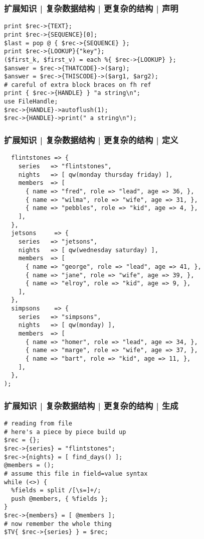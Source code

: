\begin{frame}[fragile]
  \frametitle{扩展知识 | 复杂数据结构 | 更复杂的结构 | 声明}
\begin{lstlisting}
print $rec->{TEXT};
print $rec->{SEQUENCE}[0];
$last = pop @ { $rec->{SEQUENCE} };
print $rec->{LOOKUP}{"key"};
($first_k, $first_v) = each %{ $rec->{LOOKUP} };
$answer = $rec->{THATCODE}->($arg);
$answer = $rec->{THISCODE}->($arg1, $arg2);
# careful of extra block braces on fh ref
print { $rec->{HANDLE} } "a string\n";
use FileHandle;
$rec->{HANDLE}->autoflush(1);
$rec->{HANDLE}->print(" a string\n");
\end{lstlisting}
\end{frame}

\begin{frame}[fragile]
  \frametitle{扩展知识 | 复杂数据结构 | 更复杂的结构 | 定义}
\begin{lstlisting}[basicstyle=\footnotesize\tt]
%TV = (
  flintstones => {
    series   => "flintstones",
    nights   => [ qw(monday thursday friday) ],
    members  => [
      { name => "fred", role => "lead", age => 36, },
      { name => "wilma", role => "wife", age => 31, },
      { name => "pebbles", role => "kid", age => 4, },
    ],
  },
  jetsons     => {
    series   => "jetsons",
    nights   => [ qw(wednesday saturday) ],
    members  => [
      { name => "george", role => "lead", age => 41, },
      { name => "jane", role => "wife", age => 39, },
      { name => "elroy", role => "kid", age => 9, },
    ],
  },
  simpsons    => {
    series   => "simpsons",
    nights   => [ qw(monday) ],
    members  => [
      { name => "homer", role => "lead", age => 34, },
      { name => "marge", role => "wife", age => 37, },
      { name => "bart", role => "kid", age => 11, },
    ],
  },
);
\end{lstlisting}
\end{frame}

\begin{frame}[fragile]
  \frametitle{扩展知识 | 复杂数据结构 | 更复杂的结构 | 生成}
\begin{lstlisting}
# reading from file
# here's a piece by piece build up
$rec = {};
$rec->{series} = "flintstones";
$rec->{nights} = [ find_days() ];
@members = ();
# assume this file in field=value syntax
while (<>) {
  %fields = split /[\s=]+/;
  push @members, { %fields };
}
$rec->{members} = [ @members ];
# now remember the whole thing
$TV{ $rec->{series} } = $rec;
\end{lstlisting}
\end{frame}

